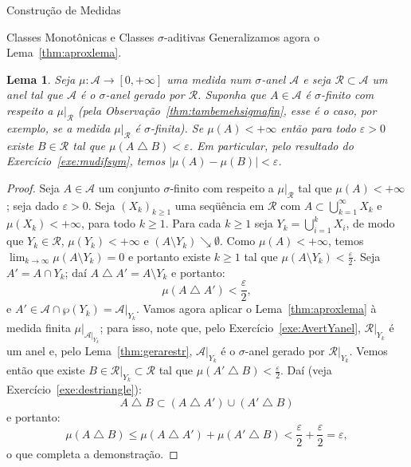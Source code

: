 \documentclass[oneside,final,11pt]{amsbook}
\theoremstyle{remark}\newtheorem{exercise}{Exercício}[chapter]
\theoremstyle{remark}\newtheorem{*exercise}[exercise]{\hbox to 0pt{\hskip 0pt minus 1fil*}Exercício}
\theoremstyle{definition}\newtheorem{exdefin}{Definição}[chapter]
\theoremstyle{plain}\newtheorem{teo}{Teorema}[section]
\theoremstyle{plain}\newtheorem{lem}[teo]{Lema}
\theoremstyle{plain}\newtheorem{prop}[teo]{Proposição}
\theoremstyle{plain}\newtheorem{cor}[teo]{Corolário}
\theoremstyle{definition}\newtheorem{defin}[teo]{Definição}
\theoremstyle{remark}\newtheorem{rem}[teo]{Observação}
\theoremstyle{definition}\newtheorem{notation}[teo]{Notação}
\theoremstyle{definition}\newtheorem{convention}[teo]{Convenção}
\theoremstyle{definition}\newtheorem{example}[teo]{Exemplo}
\numberwithin{section}{chapter}
\numberwithin{equation}{section}
\begin{document}
\begin{chapter}{Construção de Medidas}
\begin{section}{Classes Monotônicas e Classes ${\sigma}$-aditivas}
Generalizamos agora o Lema~\ref{thm:aproxlema}.
\begin{lem}\label{thm:aproxsigmafin}
Seja $\mu:\mathcal A\to[0,+\infty]$ uma medida num $\sigma$-anel $\mathcal A$
e seja $\mathcal R\subset\mathcal A$ um anel tal que $\mathcal A$ é o $\sigma$-anel
gerado por $\mathcal R$. Suponha que $A\in\mathcal A$ é $\sigma$-finito com respeito
a $\mu\vert_{\mathcal R}$ (pela Observação~\ref{thm:tambemehsigmafin}, esse é o caso,
por exemplo, se a medida $\mu\vert_{\mathcal R}$
é $\sigma$-finita). Se $\mu(A)<+\infty$ então para todo $\varepsilon>0$ existe
$B\in\mathcal R$ tal que $\mu(A\bigtriangleup B)<\varepsilon$. Em particular, pelo
resultado do Exercício~\ref{exe:mudifsym}, temos $\big\vert\mu(A)-\mu(B)\big\vert<\varepsilon$.
\end{lem}
\begin{proof}
Seja $A\in\mathcal A$ um conjunto $\sigma$-finito com respeito a $\mu\vert_{\mathcal R}$
tal que $\mu(A)<+\infty$; seja dado $\varepsilon>0$.
Seja $(X_k)_{k\ge1}$ uma seqüência em $\mathcal R$ com $A\subset\bigcup_{k=1}^\infty X_k$
e $\mu(X_k)<+\infty$, para todo $k\ge1$. Para cada $k\ge1$ seja $Y_k=\bigcup_{i=1}^kX_i$,
de modo que $Y_k\in\mathcal R$, $\mu(Y_k)<+\infty$ e $(A\setminus Y_k)\searrow\emptyset$.
Como $\mu(A)<+\infty$, temos $\lim_{k\to\infty}\mu(A\setminus Y_k)=0$ e portanto existe $k\ge1$ tal que
$\mu(A\setminus Y_k)<\frac\varepsilon2$. Seja $A'=A\cap Y_k$; daí
$A\bigtriangleup A'=A\setminus Y_k$ e portanto:
\[\mu(A\bigtriangleup A')<\frac\varepsilon2,\]
e $A'\in\mathcal A\cap\wp(Y_k)=\mathcal A\vert_{Y_k}$. Vamos agora aplicar o
Lema~\ref{thm:aproxlema} à medida finita $\mu\vert_{\mathcal A\vert_{Y_k}}$; para
isso, note que, pelo Exercício~\ref{exe:AvertYanel}, $\mathcal R\vert_{Y_k}$ é um anel e,
pelo Lema~\ref{thm:gerarestr}, $\mathcal A\vert_{Y_k}$ é o $\sigma$-anel gerado por $\mathcal R\vert_{Y_k}$.
Vemos então que existe $B\in\mathcal R\vert_{Y_k}\subset\mathcal R$
tal que $\mu(A'\bigtriangleup B)<\frac\varepsilon2$. Daí (veja Exercício~\ref{exe:destriangle}):
\[A\bigtriangleup B\subset(A\bigtriangleup A')\cup(A'\bigtriangleup B)\]
e portanto:
\[\mu(A\bigtriangleup B)\le\mu(A\bigtriangleup A')+\mu(A'\bigtriangleup B)
<\frac\varepsilon2+\frac\varepsilon2=\varepsilon,\]
o que completa a demonstração.
\end{proof}


\end{section}
\end{chapter}
\end{document}
